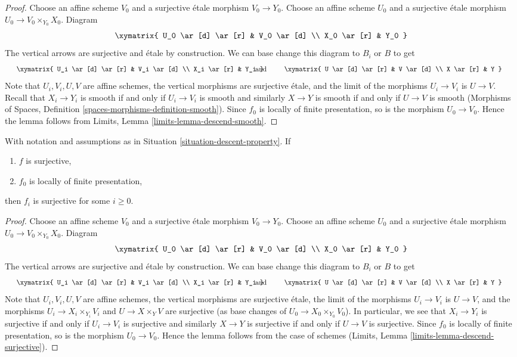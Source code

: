 \begin{proof}
Choose an affine scheme $V_0$ and a surjective \'etale morphism
$V_0 \to Y_0$. Choose an affine scheme $U_0$ and a surjective \'etale
morphism $U_0 \to V_0 \times_{Y_0} X_0$. Diagram
$$
\xymatrix{
U_0 \ar[d] \ar[r] & V_0 \ar[d] \\
X_0 \ar[r] & Y_0
}
$$
The vertical arrows are surjective and \'etale by construction.
We can base change this diagram to $B_i$ or $B$ to get
$$
\vcenter{
\xymatrix{
U_i \ar[d] \ar[r] & V_i \ar[d] \\
X_i \ar[r] & Y_i
}
}
\quad\text{and}\quad
\vcenter{
\xymatrix{
U \ar[d] \ar[r] & V \ar[d] \\
X \ar[r] & Y
}
}
$$
Note that $U_i, V_i, U, V$ are affine schemes,
the vertical morphisms are surjective \'etale, and the limit of the
morphisms $U_i \to V_i$ is $U \to V$. Recall that $X_i \to Y_i$ is smooth
if and only if $U_i \to V_i$ is smooth and similarly
$X \to Y$ is smooth if and only if $U \to V$ is smooth
(Morphisms of Spaces, Definition \ref{spaces-morphisms-definition-smooth}).
Since $f_0$ is locally of finite
presentation, so is the morphism $U_0 \to V_0$. Hence the lemma follows
from Limits, Lemma \ref{limits-lemma-descend-smooth}.
\end{proof}

\begin{lemma}
\label{lemma-descend-surjective}
With notation and assumptions as in
Situation \ref{situation-descent-property}. If
\begin{enumerate}
\item $f$ is surjective,
\item $f_0$ is locally of finite presentation,
\end{enumerate}
then $f_i$ is surjective for some $i \geq 0$.
\end{lemma}

\begin{proof}
Choose an affine scheme $V_0$ and a surjective \'etale morphism
$V_0 \to Y_0$. Choose an affine scheme $U_0$ and a surjective \'etale
morphism $U_0 \to V_0 \times_{Y_0} X_0$. Diagram
$$
\xymatrix{
U_0 \ar[d] \ar[r] & V_0 \ar[d] \\
X_0 \ar[r] & Y_0
}
$$
The vertical arrows are surjective and \'etale by construction.
We can base change this diagram to $B_i$ or $B$ to get
$$
\vcenter{
\xymatrix{
U_i \ar[d] \ar[r] & V_i \ar[d] \\
X_i \ar[r] & Y_i
}
}
\quad\text{and}\quad
\vcenter{
\xymatrix{
U \ar[d] \ar[r] & V \ar[d] \\
X \ar[r] & Y
}
}
$$
Note that $U_i, V_i, U, V$ are affine schemes, the vertical morphisms are
surjective \'etale, the limit of the morphisms $U_i \to V_i$ is $U \to V$,
and the morphisms $U_i \to X_i \times_{Y_i} V_i$ and
$U \to X \times_Y V$ are surjective (as base changes of
$U_0 \to X_0 \times_{Y_0} V_0$). In particular, we see that
$X_i \to Y_i$ is surjective if and only if $U_i \to V_i$ is surjective
and similarly $X \to Y$ is surjective if and only if $U \to V$ is surjective.
Since $f_0$ is locally of finite
presentation, so is the morphism $U_0 \to V_0$. Hence the lemma follows
from the case of schemes (Limits, Lemma \ref{limits-lemma-descend-surjective}).
\end{proof}

